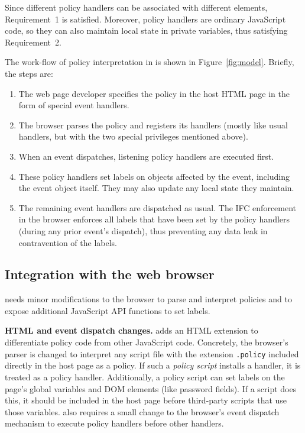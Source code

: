 Since different policy handlers can be associated with different
elements, Requirement~1 is satisfied.  Moreover, policy handlers are
ordinary JavaScript code, so they can also maintain local state in
private variables, thus satisfying Requirement~2. 

The work-flow of policy interpretation in {\sys} is shown in
Figure~\ref{fig:model}. Briefly, the steps are:

\begin{enumerate}
\item The web page developer specifies the policy in the host HTML
  page in the form of special event handlers.
\item The browser parses the policy and registers its handlers (mostly
  like usual handlers, but with the two special privileges mentioned
  above).
\item When an event dispatches, listening policy handlers are
  executed first.
\item These policy handlers set labels on objects affected by the
  event, including the event object itself. They may also
  update any local state they maintain.
\item The remaining event handlers are dispatched as usual.
  The IFC enforcement in the browser enforces all labels that have
  been set by the policy handlers (during any prior event's dispatch),
  thus preventing any data leak in contravention of the labels.
\end{enumerate}

\subsection{Integration with the web browser}

{\sys} needs minor modifications to the browser to parse and interpret
policies and to expose additional JavaScript API functions to set
labels.

\medskip \noindent \textbf{HTML and event dispatch changes.}
{\sys} adds an HTML extension to differentiate policy code from other
JavaScript code. Concretely, the browser's parser is changed to
interpret any script file with the extension \texttt{.policy} included
directly in the host page as a policy. If such a \emph{policy script}
installs a handler, it is treated as a policy handler. Additionally, a
policy script can set labels on the page's global variables and DOM
elements (like password fields). If a script does this, it should be
included in the host page before third-party scripts that use those
variables. {\sys} also requires a small change to the browser's event
dispatch mechanism to execute policy handlers before other handlers.

